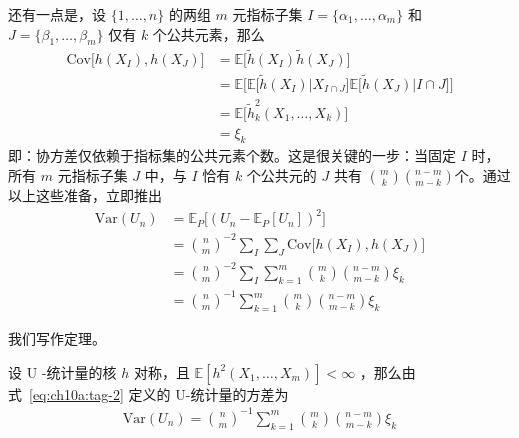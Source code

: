 还有一点是，设 $\{1,\dots,n\}$ 的两组 $m$ 元指标子集 $I=\{\alpha_1,\dots,\alpha_m\}$ 和 $J=\{\beta_1,\dots,\beta_m\}$ 仅有 $k$ 个公共元素，那么
\[\begin{aligned} \mathrm{Cov}\big[ h(X_I),h(X_J)\big]&=\mathbb E\Big[\widetilde h(X_I)\widetilde h(X_J)\Big]\\ &=\mathbb E\Big[\mathbb E\Big[\widetilde h(X_I)\Big|X_{I\cap J}\Big]\mathbb E\Big[\widetilde h(X_J)\Big|I\cap J\Big]\Big]\\ &=\mathbb E\Big[\widetilde h^2_k(X_1,\dots,X_k)\Big]\\ &=\xi_k \end{aligned}\]
即：协方差仅依赖于指标集的公共元素个数。这是很关键的一步：当固定 $I$ 时，所有 $m$ 元指标子集 $J$ 中，与 $I$ 恰有 $k$ 个公共元的 $J$ 共有 $\binom mk\binom {n-m}{m-k}$个。通过以上这些准备，立即推出
\[\begin{aligned} \mathrm{Var}(U_n)&=\mathbb E_P\Big[(U_n-\mathbb E_P[U_n])^2\Big]\\ &= \binom{n}{m}^{-2} \sum_{I} \sum_{J} \mathrm {Cov}\bigl[h(X_I),h(X_J)\bigr]\\ &=\binom{n}{m}^{-2} \sum_I\sum_{k=1}^{m}\binom mk\binom{n-m}{m-k}\xi_k\\ &=\binom{n}{m}^{-1} \sum_{k=1}^{m}\binom mk\binom{n-m}{m-k}\xi_k \end{aligned}\]

我们写作定理。

\begin{theorem}[U-统计量的方差公式]
\label{thm:ch10:u-statistic-variance}

设 U -统计量的核 $h$ 对称，且 $\mathbb E[h^2(X_1,\dots,X_m)]<\infty$ ，那么由式~\eqref{eq:ch10a:tag-2} 定义的 U-统计量的方差为
\[\begin{aligned} \mathrm{Var}(U_n)=\binom{n}{m}^{-1} \sum_{k=1}^{m}\binom mk\binom{n-m}{m-k}\xi_k \end{aligned}\]
\end{theorem}

